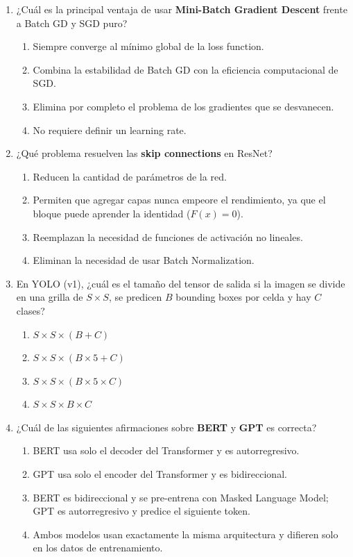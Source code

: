 \documentclass[12pt,a4paper]{article}
\begin{document}
\begin{enumerate}[label=\arabic*)]
    \item ¿Cuál es la principal ventaja de usar \textbf{Mini-Batch Gradient Descent} frente a Batch GD y SGD puro?
    \begin{enumerate}[label=\Alph*)]
        \item Siempre converge al mínimo global de la loss function.
        \item Combina la estabilidad de Batch GD con la eficiencia computacional de SGD.
        \item Elimina por completo el problema de los gradientes que se desvanecen.
        \item No requiere definir un learning rate.
    \end{enumerate}

    \item ¿Qué problema resuelven las \textbf{skip connections} en ResNet?
    \begin{enumerate}[label=\Alph*)]
        \item Reducen la cantidad de parámetros de la red.
        \item Permiten que agregar capas nunca empeore el rendimiento, ya que el bloque puede aprender la identidad ($F(x) = 0$).
        \item Reemplazan la necesidad de funciones de activación no lineales.
        \item Eliminan la necesidad de usar Batch Normalization.
    \end{enumerate}

    \item En YOLO (v1), ¿cuál es el tamaño del tensor de salida si la imagen se divide en una grilla de $S \times S$, se predicen $B$ bounding boxes por celda y hay $C$ clases?
    \begin{enumerate}[label=\Alph*)]
        \item $S \times S \times (B + C)$
        \item $S \times S \times (B \times 5 + C)$
        \item $S \times S \times (B \times 5 \times C)$
        \item $S \times S \times B \times C$
    \end{enumerate}

    \item ¿Cuál de las siguientes afirmaciones sobre \textbf{BERT} y \textbf{GPT} es correcta?
    \begin{enumerate}[label=\Alph*)]
        \item BERT usa solo el decoder del Transformer y es autorregresivo.
        \item GPT usa solo el encoder del Transformer y es bidireccional.
        \item BERT es bidireccional y se pre-entrena con Masked Language Model; GPT es autorregresivo y predice el siguiente token.
        \item Ambos modelos usan exactamente la misma arquitectura y difieren solo en los datos de entrenamiento.
    \end{enumerate}


\end{enumerate}
\end{document}
